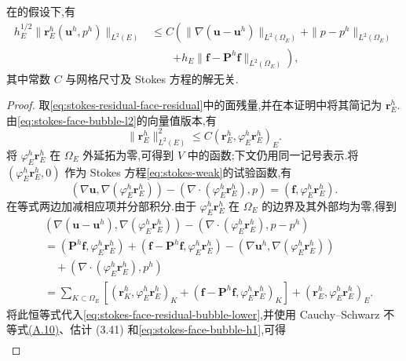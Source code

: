 \begin{lemma}[网格面残量的局部估计]\label{lem:stokes-face-residual-local-estimate}
在的假设下,有
\begingroup\small
\begin{equation}\label{eq:stokes-face-residual-local-estimate}
\begin{aligned}
 h_E^{1/2}\|\bm{r}_E^h(\bm{u}^h,p^h)\|_{L^2(E)}
 &\leq C\left(
   \|\nabla(\bm{u}-\bm{u}^h)\|_{L^2(\Omega_E)}
   +\|p-p^h\|_{L^2(\Omega_E)}\right.\\
 &\qquad\left.
   +h_E\|\bm{f}-\bm{P}^h\bm{f}\|_{L^2(\Omega_E)}
 \right),
\end{aligned}
\end{equation}
\endgroup
其中常数 $C$ 与网格尺寸及 Stokes 方程的解无关.
\end{lemma}
\begin{proof}
取\cref{eq:stokes-residual-face-residual}中的面残量,并在本证明中将其简记为 $\bm{r}_E^h$.由\cref{eq:stokes-face-bubble-l2}的向量值版本,有
\begin{equation}\label{eq:stokes-face-residual-bubble-lower}
 \|\bm{r}_E^h\|_{L^2(E)}^2
 \leq C(\bm{r}_E^h,\varphi_E^h\bm{r}_E^h)_E.
\end{equation}
将 $\varphi_E^h\bm{r}_E^h$ 在 $\Omega_E$ 外延拓为零,可得到 $V$ 中的函数;下文仍用同一记号表示.将 $(\varphi_E^h\bm{r}_E^h,0)$ 作为 Stokes 方程\cref{eq:stokes-weak}的试验函数,有
\[
 (\nabla\bm{u},\nabla(\varphi_E^h\bm{r}_E^h))
 -(\nabla\cdot(\varphi_E^h\bm{r}_E^h),p)
 =(\bm{f},\varphi_E^h\bm{r}_E^h).
\]
在等式两边加减相应项并分部积分.由于 $\varphi_E^h\bm{r}_E^h$ 在 $\Omega_E$ 的边界及其外部均为零,得到
\begin{align*}
 &(\nabla(\bm{u}-\bm{u}^h),
       \nabla(\varphi_E^h\bm{r}_E^h))
  -(\nabla\cdot(\varphi_E^h\bm{r}_E^h),p-p^h)\\
 &= (\bm{P}^h\bm{f},\varphi_E^h\bm{r}_E^h)
   +(\bm{f}-\bm{P}^h\bm{f},
       \varphi_E^h\bm{r}_E^h)
   -(\nabla\bm{u}^h,\nabla(\varphi_E^h\bm{r}_E^h))\\
 &\quad+(\nabla\cdot(\varphi_E^h\bm{r}_E^h),p^h)\\
 &=\sum_{K\subset\Omega_E}
   \left[(\bm{r}_K^h,\varphi_E^h\bm{r}_E^h)_K
   +(\bm{f}-\bm{P}^h\bm{f},
       \varphi_E^h\bm{r}_E^h)_K\right]
   +(\bm{r}_E^h,\varphi_E^h\bm{r}_E^h)_E.
\end{align*}
将此恒等式代入\cref{eq:stokes-face-residual-bubble-lower},并使用 Cauchy--Schwarz 不等式\hyperref[eq:appendix-a-10]{(A.10)}、估计 (3.41) 和\cref{eq:stokes-face-bubble-h1},可得
{\small
\[
\begin{aligned}

\end{aligned}\]}
\end{proof}

